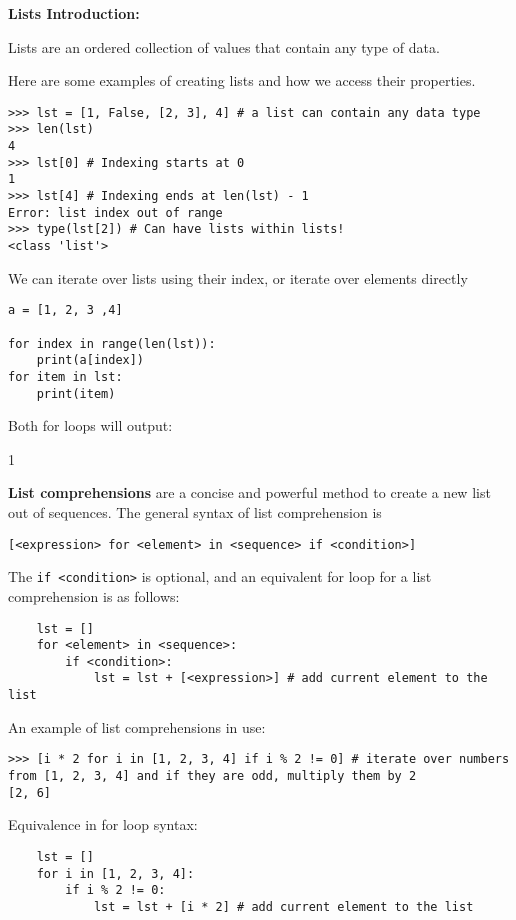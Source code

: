 \textbf{Lists Introduction:}

Lists are an ordered collection of values that contain any type of data.

Here are some examples of creating lists and how we access their properties.

\begin{lstlisting}
>>> lst = [1, False, [2, 3], 4] # a list can contain any data type
>>> len(lst)
4
>>> lst[0] # Indexing starts at 0
1
>>> lst[4] # Indexing ends at len(lst) - 1
Error: list index out of range
>>> type(lst[2]) # Can have lists within lists!
<class 'list'>
\end{lstlisting}

We can iterate over lists using their index, or iterate over elements directly

\begin{lstlisting}
a = [1, 2, 3 ,4]

for index in range(len(lst)):
	print(a[index])
for item in lst:
	print(item)
\end{lstlisting}

Both for loops will output:

1 

\textbf{List comprehensions} are a concise and powerful method to create a new list out of sequences.
 The general syntax of list comprehension is
\begin{lstlisting}
[<expression> for <element> in <sequence> if <condition>]
\end{lstlisting}

The \lstinline{if <condition>} is optional, and an equivalent for loop for a list comprehension is as follows:
\begin{lstlisting}
	lst = []
	for <element> in <sequence>:
		if <condition>:
			lst = lst + [<expression>] # add current element to the list
\end{lstlisting}

An example of list comprehensions in use:

\begin{lstlisting}
>>> [i * 2 for i in [1, 2, 3, 4] if i % 2 != 0] # iterate over numbers from [1, 2, 3, 4] and if they are odd, multiply them by 2
[2, 6]
\end{lstlisting}

Equivalence in for loop syntax:

\begin{lstlisting}
	lst = []
	for i in [1, 2, 3, 4]:
		if i % 2 != 0:
			lst = lst + [i * 2] # add current element to the list
\end{lstlisting}

